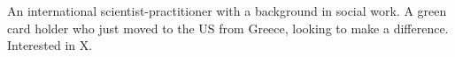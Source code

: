 

\begin{cvparagraph}

An international scientist-practitioner with a background in social work. A green card holder who just moved to the US from Greece, looking to make a difference. Interested in X.
\end{cvparagraph}

